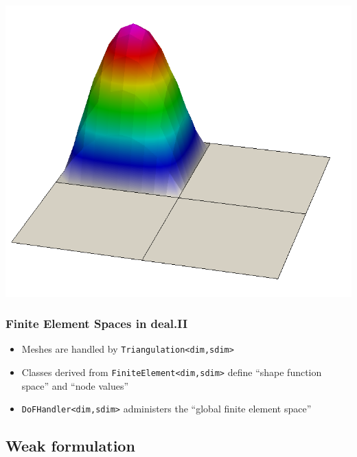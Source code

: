 \begin{frame}
\begin{center}
    \includegraphics[height=.27\textheight]{graph/dgbasis1-22}
  \end{center}
\end{frame}

\begin{frame}
  \frametitle{Finite Element Spaces in deal.II}
  \begin{itemize}
  \item Meshes are handled by \lstinline!Triangulation<dim,sdim>!
  \item Classes derived from \lstinline!FiniteElement<dim,sdim>!
    define ``shape function space'' and ``node values''
  \item \lstinline!DoFHandler<dim,sdim>! administers the ``global
    finite element space''
  \end{itemize}
  \begin{block}{}
    
  \end{block}
\end{frame}

\subsection{Weak formulation}

